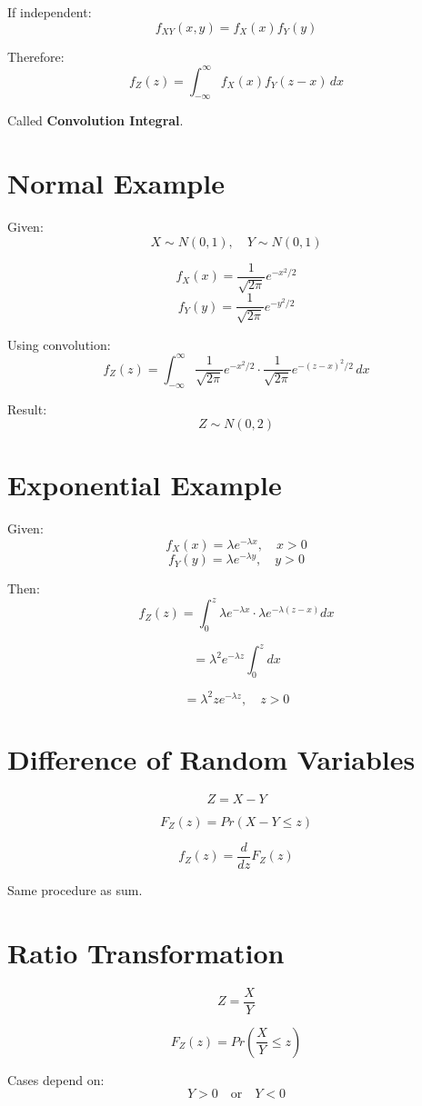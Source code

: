\documentclass[12pt]{article}
\begin{document}
If independent:
\[
f_{XY}(x,y) = f_X(x)f_Y(y)
\]

Therefore:
\[
f_Z(z)
=
\int_{-\infty}^{\infty}
f_X(x)f_Y(z-x)\,dx
\]

Called \textbf{Convolution Integral}.

\section{Normal Example}

Given:
\[
X \sim N(0,1), \quad Y \sim N(0,1)
\]

\[
f_X(x) = \frac{1}{\sqrt{2\pi}} e^{-x^2/2}
\]
\[
f_Y(y) = \frac{1}{\sqrt{2\pi}} e^{-y^2/2}
\]

Using convolution:
\[
f_Z(z)
=
\int_{-\infty}^{\infty}
\frac{1}{\sqrt{2\pi}}e^{-x^2/2}
\cdot
\frac{1}{\sqrt{2\pi}}e^{-(z-x)^2/2}
\,dx
\]

Result:
\[
Z \sim N(0,2)
\]

\section{Exponential Example}

Given:
\[
f_X(x)=\lambda e^{-\lambda x}, \quad x>0
\]
\[
f_Y(y)=\lambda e^{-\lambda y}, \quad y>0
\]

Then:
\[
f_Z(z)
=
\int_0^z
\lambda e^{-\lambda x}
\cdot
\lambda e^{-\lambda(z-x)}
dx
\]

\[
= \lambda^2 e^{-\lambda z} \int_0^z dx
\]

\[
= \lambda^2 z e^{-\lambda z}, \quad z>0
\]

\section{Difference of Random Variables}

\[
Z = X-Y
\]

\[
F_Z(z)=Pr(X-Y \le z)
\]

\[
f_Z(z)=\frac{d}{dz}F_Z(z)
\]

Same procedure as sum.

\section{Ratio Transformation}

\[
Z = \frac{X}{Y}
\]

\[
F_Z(z)=Pr\left(\frac{X}{Y} \le z\right)
\]

Cases depend on:
\[
Y>0 \quad \text{or} \quad Y<0
\]
\end{document}
